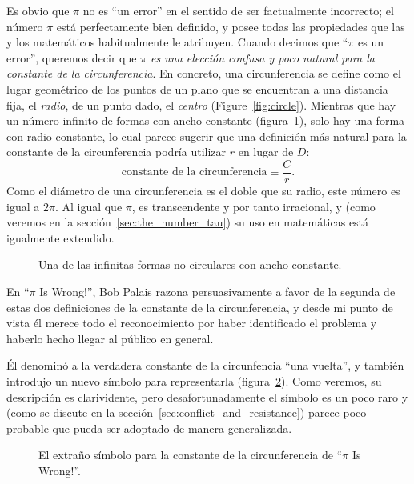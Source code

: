 Es obvio que $\pi$ no es ``un error'' en el sentido de ser factualmente incorrecto; el número $\pi$ está perfectamente bien definido, y posee todas las propiedades que las y los matemáticos habitualmente le atribuyen. Cuando decimos que ``$\pi$ es un error'', queremos decir que \emph{$\pi$ es una elección confusa y poco natural para la constante de la circunferencia}. En concreto, una circunferencia se define como el lugar geométrico de los puntos de un plano que se encuentran a una distancia fija, el \emph{radio}, de un punto dado, el \emph{centro} (Figure~\ref{fig:circle}). Mientras que hay un número infinito de formas con ancho constante (figura~\ref{fig:constant_width}), solo hay una forma con radio constante, lo cual parece sugerir que una definición más natural para la constante de la circunferencia podría utilizar $r$ en lugar de $D$:
\begin{equation}
\label{eq:circle_constant}
\mbox{constante de la circunferencia} \equiv \frac{C}{r}.
\end{equation}
Como el diámetro de una circunferencia es el doble que su radio, este número es igual a $2\pi$. Al igual que $\pi$, es transcendente y por tanto irracional, y (como veremos en la sección~\ref{sec:the_number_tau}) su uso en matemáticas está igualmente extendido.

\begin{figure}
\caption{Una de las infinitas formas no circulares con ancho constante.\label{fig:constant_width}}
\end{figure}

En ``$\pi$ Is Wrong!'', Bob Palais razona persuasivamente a favor de la segunda de estas dos definiciones de la constante de la circunferencia, y desde mi punto de vista él merece
todo el reconocimiento por haber identificado el problema y haberlo hecho llegar al público en general.

Él denominó a la verdadera constante de la circunfencia ``una vuelta'', y también introdujo un nuevo símbolo para representarla (figura~\ref{fig:palais_tau}). Como veremos, su descripción es clarividente, pero desafortunadamente el símbolo es un poco raro y (como se discute en la sección~\ref{sec:conflict_and_resistance}) parece poco probable que pueda ser adoptado de manera generalizada.

\begin{figure}
\caption{El extraño símbolo para la constante de la circunferencia de ``$\pi$ Is Wrong!''.\label{fig:palais_tau}}
\end{figure}

